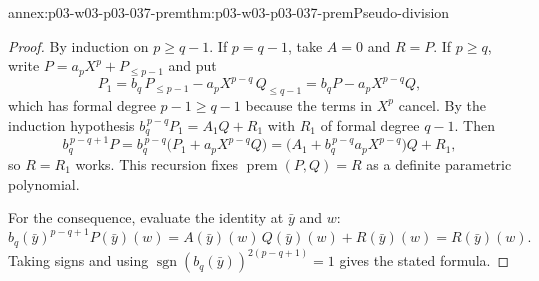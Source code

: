 \begin{annexitem}{annex:p03-w03-p03-037-prem}{thm:p03-w03-p03-037-prem}{Pseudo-division}
\begin{proof}
By induction on \(p\geq q-1\).  If \(p=q-1\), take \(A=0\) and \(R=P\).  If
\(p\geq q\), write \(P=a_pX^p+P_{\leq p-1}\) and put
\[
P_1=b_q\,P_{\leq p-1}-a_pX^{p-q}\,Q_{\leq q-1}=b_qP-a_pX^{p-q}Q,
\]
which has formal degree \(p-1\geq q-1\) because the terms in \(X^p\) cancel.
By the induction hypothesis \(b_q^{\,p-q}P_1=A_1Q+R_1\) with \(R_1\) of
formal degree \(q-1\).  Then
\[
b_q^{\,p-q+1}P=b_q^{\,p-q}\bigl(P_1+a_pX^{p-q}Q\bigr)
=\bigl(A_1+b_q^{\,p-q}a_pX^{p-q}\bigr)Q+R_1,
\]
so \(R=R_1\) works.  This recursion fixes \(\operatorname{prem}(P,Q)=R\) as a
definite parametric polynomial.

For the consequence, evaluate the identity at \(\bar y\) and \(w\):
\[
b_q(\bar y)^{p-q+1}P(\bar y)(w)=A(\bar y)(w)\,Q(\bar y)(w)+R(\bar y)(w)
=R(\bar y)(w).
\]  Taking signs and using
\(\operatorname{sgn}(b_q(\bar y))^{2(p-q+1)}=1\) gives the stated formula.
\end{proof}
\end{annexitem}

